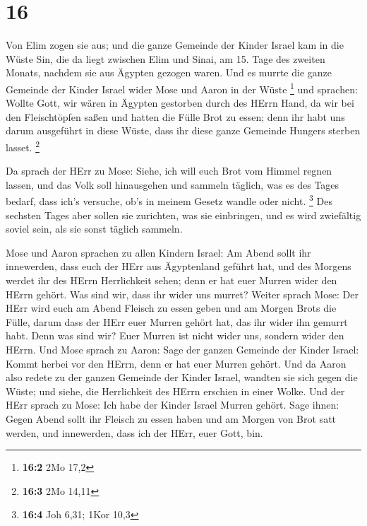 \hypertarget{section-15}{%
\section{16}\label{section-15}}

 Von Elim zogen sie aus; und die ganze Gemeinde der Kinder
Israel kam in die Wüste Sin, die da liegt zwischen Elim und Sinai, am
15. Tage des zweiten Monats, nachdem sie aus Ägypten gezogen waren.
 Und es murrte die ganze Gemeinde der Kinder Israel wider
Mose und Aaron in der Wüste \footnote{\textbf{16:2} 2Mo 17,2}
 und sprachen: Wollte Gott, wir wären in Ägypten gestorben
durch des HErrn Hand, da wir bei den Fleischtöpfen saßen und hatten die
Fülle Brot zu essen; denn ihr habt uns darum ausgeführt in diese Wüste,
dass ihr diese ganze Gemeinde Hungers sterben lasset. \footnote{\textbf{16:3}
  2Mo 14,11}

 Da sprach der HErr zu Mose: Siehe, ich will euch Brot vom
Himmel regnen lassen, und das Volk soll hinausgehen und sammeln täglich,
was es des Tages bedarf, dass ich's versuche, ob's in meinem Gesetz
wandle oder nicht. \footnote{\textbf{16:4} Joh 6,31; 1Kor 10,3}
 Des sechsten Tages aber sollen sie zurichten, was sie
einbringen, und es wird zwiefältig soviel sein, als sie sonst täglich
sammeln.

 Mose und Aaron sprachen zu allen Kindern Israel: Am Abend
sollt ihr innewerden, dass euch der HErr aus Ägyptenland geführt hat,
 und des Morgens werdet ihr des HErrn Herrlichkeit sehen;
denn er hat euer Murren wider den HErrn gehört. Was sind wir, dass ihr
wider uns murret?  Weiter sprach Mose: Der HErr wird euch
am Abend Fleisch zu essen geben und am Morgen Brots die Fülle, darum
dass der HErr euer Murren gehört hat, das ihr wider ihn gemurrt habt.
Denn was sind wir? Euer Murren ist nicht wider uns, sondern wider den
HErrn.  Und Mose sprach zu Aaron: Sage der ganzen Gemeinde
der Kinder Israel: Kommt herbei vor den HErrn, denn er hat euer Murren
gehört.  Und da Aaron also redete zu der ganzen Gemeinde
der Kinder Israel, wandten sie sich gegen die Wüste; und siehe, die
Herrlichkeit des HErrn erschien in einer Wolke.  Und der
HErr sprach zu Mose:  Ich habe der Kinder Israel Murren
gehört. Sage ihnen: Gegen Abend sollt ihr Fleisch zu essen haben und am
Morgen von Brot satt werden, und innewerden, dass ich der HErr, euer
Gott, bin.

